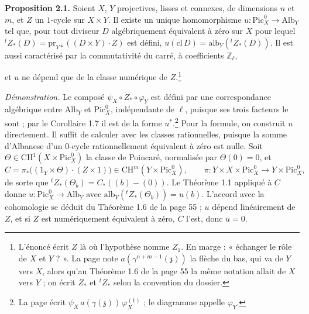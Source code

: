 \documentclass[11pt,a4paper]{article}
\begin{document}
\textbf{Proposition 2.1.} Soient $X$, $Y$ projectives, lisses et connexes, de
dimensions $n$ et $m$, et $Z$ un $1$-cycle sur $X \times Y$. Il existe un unique
homomorphisme $u \colon \mathrm{Pic}^{0}_{X} \to \mathrm{Alb}_{Y}$ tel que, pour
tout diviseur $D$ algébriquement équivalent à zéro sur $X$ pour lequel
${}^{t}Z_{*}(D) = \mathrm{pr}_{Y*}((D \times Y)\cdot Z)$ est défini,
$u(\mathrm{cl}\,D) = \mathrm{alb}_{Y}({}^{t}Z_{*}(D))$. Il est aussi caractérisé
par la commutativité du carré, à coefficients $\mathbb{Z}_{\ell}$,


et $u$ ne dépend que de la classe numérique de $Z$.\footnote{L'énoncé écrit
$Z$ là où l'hypothèse nomme $Z_{1}$. En marge : « échanger le rôle de $X$ et $Y$
? ». La page note $a(\gamma^{n+m-1}(\mathfrak{z}))$ la flèche du bas, qui va de
$Y$ vers $X$, alors qu'au Théorème 1.6 de la page 55 la même notation allait de
$X$ vers $Y$ ; on écrit $Z_{*}$ et ${}^{t}Z_{*}$ selon la convention du
dossier.}

\emph{Démonstration.} Le composé $\psi_{X} \circ Z_{*} \circ \varphi_{Y}$ est
défini par une correspondance algébrique entre $\mathrm{Alb}_{Y}$ et
$\mathrm{Pic}^{0}_{X}$, indépendante de $\ell$, puisque ses trois facteurs le
sont ; par le Corollaire 1.7 il est de la forme $u^{*}$.\footnote{La page écrit
$\psi_{X}\, a(\gamma(\mathfrak{z}))\, \varphi_{X}^{(1)}$ ; le diagramme appelle
$\varphi_{Y}$.} Pour la formule, on construit $u$ directement. Il suffit de
calculer avec les classes rationnelles, puisque la somme d'Albanese d'un
$0$-cycle rationnellement équivalent à zéro est nulle. Soit $\Theta \in
\mathrm{CH}^{1}(X \times \mathrm{Pic}^{0}_{X})$ la classe de Poincaré, normalisée
par $\Theta(0) = 0$, et
\[
C = \pi_{*}\bigl((1_{Y} \times \Theta) \cdot (Z \times 1)\bigr) \in
\mathrm{CH}^{m}(Y \times \mathrm{Pic}^{0}_{X}) ,
\qquad \pi \colon Y \times X \times \mathrm{Pic}^{0}_{X} \to Y \times
\mathrm{Pic}^{0}_{X} ,
\]
de sorte que ${}^{t}Z_{*}(\Theta_{b}) = C_{*}((b) - (0))$. Le Théorème 1.1
appliqué à $C$ donne $u \colon \mathrm{Pic}^{0}_{X} \to \mathrm{Alb}_{Y}$ avec
$\mathrm{alb}_{Y}({}^{t}Z_{*}(\Theta_{b})) = u(b)$. L'accord avec la cohomologie
se déduit du Théorème 1.6 de la page 55 ; $u$ dépend linéairement de $Z$, et si
$Z$ est numériquement équivalent à zéro, $C$ l'est, donc $u = 0$.
\end{document}
